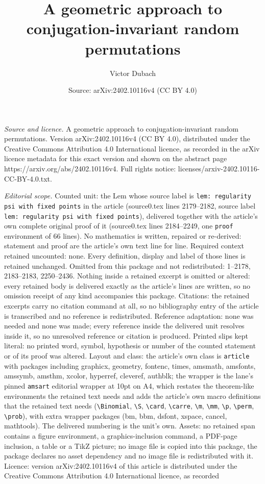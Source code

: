 \documentclass[10pt,a4paper]{amsart}
\title[A geometric approach to conjugation-invariant random permuta]{A geometric approach to conjugation-invariant random permutations}
\author{Victor Dubach}
\date{Source: arXiv:2402.10116v4 (CC BY 4.0)}
\begin{document}
\maketitle

\noindent\emph{Source and licence.} A geometric approach to conjugation-invariant random permutations. Version arXiv:2402.10116v4 (CC BY 4.0), distributed under the Creative Commons Attribution 4.0 International licence, as recorded in the arXiv licence metadata for this exact version and shown on the abstract page https://arxiv.org/abs/2402.10116v4. Full rights notice: licenses/arxiv-2402.10116-CC-BY-4.0.txt.\par\smallskip

\noindent\textit{Editorial scope.} Counted unit: the Lem whose source label is \texttt{lem: regularity psi with fixed points} in the article (source0.tex lines 2179--2182, source label \texttt{lem: regularity psi with fixed points}), delivered together with the article's own complete original proof of it (source0.tex lines 2184--2249, one \texttt{proof} environment of 66 lines). No mathematics is written, repaired or re-derived: statement and proof are the article's own text line for line. Required context retained uncounted: none. Every definition, display and label of those lines is retained unchanged. Omitted from this package and not redistributed: 1--2178, 2183--2183, 2250--2436. Nothing inside a retained excerpt is omitted or altered: every retained body is delivered exactly as the article's lines are written, so no omission receipt of any kind accompanies this package. Citations: the retained excerpts carry no citation command at all, so no bibliography entry of the article is transcribed and no reference is redistributed. Reference adaptation: none was needed and none was made; every reference inside the delivered unit resolves inside it, so no unresolved reference or citation is produced. Printed slips kept literal: no printed word, symbol, hypothesis or number of the counted statement or of its proof was altered. Layout and class: the article's own class is \texttt{article} with packages including graphicx, geometry, fontenc, times, amsmath, amsfonts, amssymb, amsthm, xcolor, hyperref, cleveref, authblk; the wrapper is the lane's pinned \texttt{amsart} editorial wrapper at 10pt on A4, which restates the theorem-like environments the retained text needs and adds the article's own macro definitions that the retained text needs (\texttt{\textbackslash Binomial}, \texttt{\textbackslash S}, \texttt{\textbackslash card}, \texttt{\textbackslash carre}, \texttt{\textbackslash m}, \texttt{\textbackslash mm}, \texttt{\textbackslash p}, \texttt{\textbackslash perm}, \texttt{\textbackslash prob}), with extra wrapper packages (bm, bbm, dsfont, xspace, cancel, mathtools). The delivered numbering is the unit's own. Assets: no retained span contains a figure environment, a graphics-inclusion command, a PDF-page inclusion, a table or a TikZ picture; no image file is copied into this package, the package declares no asset dependency and no image file is redistributed with it. Licence: version arXiv:2402.10116v4 of this article is distributed under the Creative Commons Attribution 4.0 International licence, as recorded 
\end{document}
